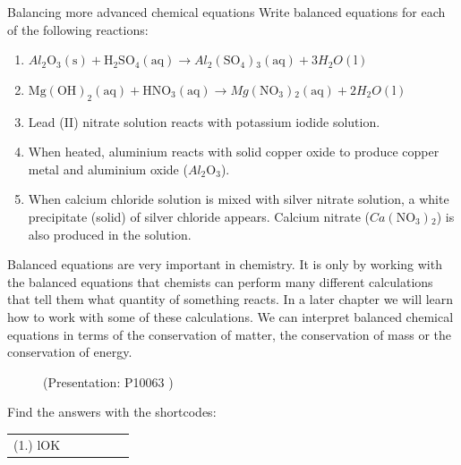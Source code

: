             \begin{exercises}{  Balancing more advanced chemical equations
      }
            \nopagebreak
      \label{m38727*id66790}Write balanced equations for each of the following reactions:\par 
      \label{m38727*id66796}\begin{enumerate}[noitemsep, label=\textbf{\arabic*}. ] 
            \label{m38727*uid31}\item 
${Al}_{2}{\mathrm{O}}_{3}\left(\mathrm{s}\right)+{\mathrm{H}}_{2}{\mathrm{SO}}_{4}\left(\mathrm{aq}\right)\to {Al}_{2}\left({\mathrm{SO}}_{4}\right){}_{3}\left(\mathrm{aq}\right)+3{{H}}_{2}{O}\left(\mathrm{l}\right)$
        \label{m38727*uid32}\item 
        ${\mathrm{Mg\left(OH\right)}}_{2}\left(\mathrm{aq}\right)+{\mathrm{HNO}}_{3}\left(\mathrm{aq}\right)\to Mg\left({\mathrm{NO}}_{3}\right){}_{2}\left(\mathrm{aq}\right)+2{{H}}_{2}{O}\left(\mathrm{l}\right)$
        \label{m38727*uid33}\item Lead (II) nitrate solution reacts with potassium iodide solution.
\label{m38727*uid34}\item When heated, aluminium reacts with solid copper oxide to produce copper metal and aluminium oxide (${Al}_{2}{\mathrm{O}}_{3}$).
\label{m38727*uid35}\item When calcium chloride solution is mixed with silver nitrate solution, a white precipitate (solid) of silver chloride appears. Calcium nitrate ($Ca\left({\mathrm{NO}}_{3}\right){}_{2}$) is also produced in the solution.
        \end{enumerate}
    \label{m38727*eip-429}Balanced equations are very important in chemistry. It is only by working with the balanced equations that chemists can perform many different calculations that tell them what quantity of something reacts. In a later chapter we will learn how to work with some of these calculations. We can interpret balanced chemical equations in terms of the conservation of matter, the conservation of mass or the conservation of energy. \label{m38727*eip-366}
    \setcounter{subfigure}{0}
	\begin{figure}[H] %
    \label{m38727*slidesharemedia}\label{m38727*slideshareflash} { (Presentation:  P10063 )}
      \vspace{2pt}
    \vspace{.1in}
 \end{figure}       \par \label{m38727*cid6}
\par {} Find the answers with the shortcodes:
 \par \begin{tabular}[h]{cccccc}
 (1.) lOK  & \end{tabular}
\end{exercises}
